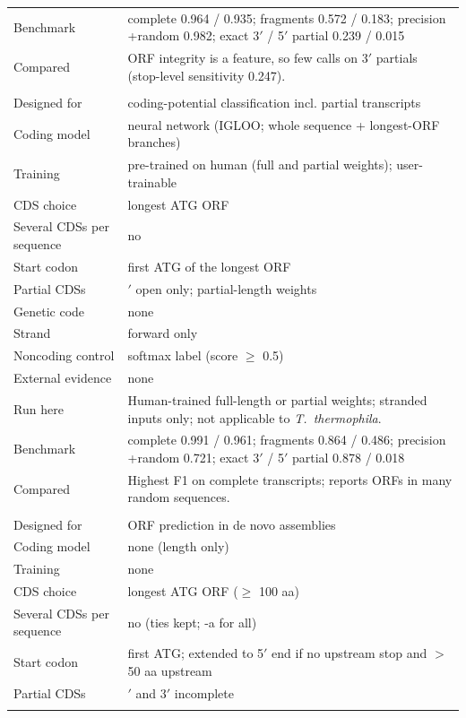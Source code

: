 \begin{longtable}{@{}>{\raggedright}p{3.2cm}>{\raggedright\arraybackslash}p{12.3cm}@{}}
Benchmark & complete 0.964 / 0.935; fragments 0.572 / 0.183; precision +random 0.982; exact 3$'$ / 5$'$ partial 0.239 / 0.015 \\*
Compared & ORF integrity is a feature, so few calls on 3$'$ partials (stop-level sensitivity 0.247). \\
\addlinespace[6pt]
\multicolumn{2}{@{}l}{\textbf{RNAsamba} \citep{Camargo2020} (0.2.5)} \\*
Designed for & coding-potential classification incl. partial transcripts \\*
Coding model & neural network (IGLOO; whole sequence + longest-ORF branches) \\*
Training & pre-trained on human (full and partial weights); user-trainable \\*
CDS choice & longest ATG ORF \\*
Several CDSs per sequence & no \\*
Start codon & first ATG of the longest ORF \\*
Partial CDSs & 3$'$ open only; partial-length weights \\*
Genetic code & none \\*
Strand & forward only \\*
Noncoding control & softmax label (score $\ge$ 0.5) \\*
External evidence & none \\*
Run here & Human-trained full-length or partial weights; stranded inputs only; not applicable to \textit{T.~thermophila}. \\*
Benchmark & complete 0.991 / 0.961; fragments 0.864 / 0.486; precision +random 0.721; exact 3$'$ / 5$'$ partial 0.878 / 0.018 \\*
Compared & Highest F1 on complete transcripts; reports ORFs in many random sequences. \\
\addlinespace[6pt]
\multicolumn{2}{@{}l}{\textbf{Borf} \citep{Signal2021} (1.2)} \\*
Designed for & ORF prediction in de novo assemblies \\*
Coding model & none (length only) \\*
Training & none \\*
CDS choice & longest ATG ORF ($\ge$ 100 aa) \\*
Several CDSs per sequence & no (ties kept; -a for all) \\*
Start codon & first ATG; extended to 5$'$ end if no upstream stop and $>$ 50 aa upstream \\*
Partial CDSs & 5$'$ and 3$'$ incomplete \\*

\end{longtable}
